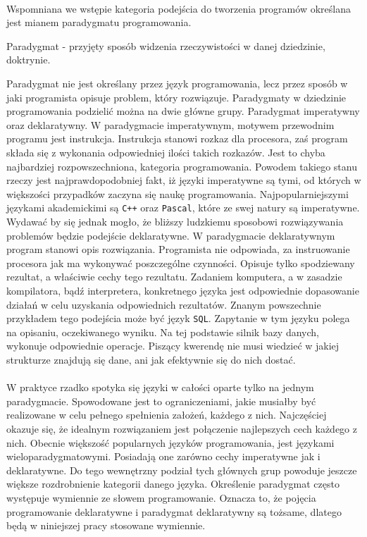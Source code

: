 \documentclass[a4paper,10pt]{report}
\begin{document}
\paragraph{}
Wspomniana we wstępie kategoria podejścia do tworzenia programów określana jest mianem paradygmatu programowania.
\begin{theo}
	Paradygmat - przyjęty sposób widzenia rzeczywistości w danej dziedzinie, doktrynie.
\end{theo}
 Paradygmat nie jest określany przez język programowania, lecz przez sposób w jaki programista opisuje problem, który rozwiązuje. Paradygmaty w dziedzinie programowania podzielić można na dwie główne grupy. Paradygmat imperatywny oraz deklaratywny. W paradygmacie imperatywnym, motywem przewodnim programu jest instrukcja. Instrukcja stanowi rozkaz dla procesora, zaś program składa się z wykonania odpowiedniej ilości takich rozkazów. Jest to chyba najbardziej rozpowszechniona, kategoria programowania. Powodem takiego stanu rzeczy jest najprawdopodobniej fakt, iż języki imperatywne są tymi, od których w większości przypadków zaczyna się naukę programowania. Najpopularniejszymi językami akademickimi są \verb|C++| oraz \verb|Pascal|, które ze swej natury są imperatywne. Wydawać by się jednak mogło, że bliższy ludzkiemu sposobowi rozwiązywania problemów będzie podejście deklaratywne. W paradygmacie deklaratywnym program stanowi opis rozwiązania. Programista nie odpowiada, za instruowanie procesora jak ma wykonywać poszczególne czynności. Opisuje tylko spodziewany rezultat, a właściwie cechy tego rezultatu. Zadaniem komputera, a w zasadzie kompilatora, bądź interpretera, konkretnego języka jest odpowiednie dopasowanie działań w celu uzyskania odpowiednich rezultatów. Znanym powszechnie przykładem tego podejścia może być język \verb|SQL|. Zapytanie w tym języku polega na opisaniu, oczekiwanego wyniku. Na tej podstawie silnik bazy danych, wykonuje odpowiednie operacje. Piszący kwerendę nie musi wiedzieć w jakiej strukturze znajdują się dane, ani jak efektywnie się do nich dostać. 
 \paragraph{}
 W praktyce rzadko spotyka się języki w całości oparte tylko na jednym paradygmacie. Spowodowane jest to ograniczeniami, jakie musiałby być realizowane w celu pełnego spełnienia założeń, każdego z nich. Najczęściej okazuje się, że idealnym rozwiązaniem jest połączenie najlepszych cech każdego z nich. Obecnie większość popularnych języków programowania, jest językami wieloparadygmatowymi. Posiadają one zarówno cechy imperatywne jak i deklaratywne. Do tego wewnętrzny podział tych głównych grup powoduje jeszcze większe rozdrobnienie kategorii danego języka. Określenie paradygmat często występuje wymiennie ze słowem programowanie. Oznacza to, że pojęcia programowanie deklaratywne i paradygmat deklaratywny są tożsame, dlatego będą w niniejszej pracy stosowane wymiennie.
\end{document}
